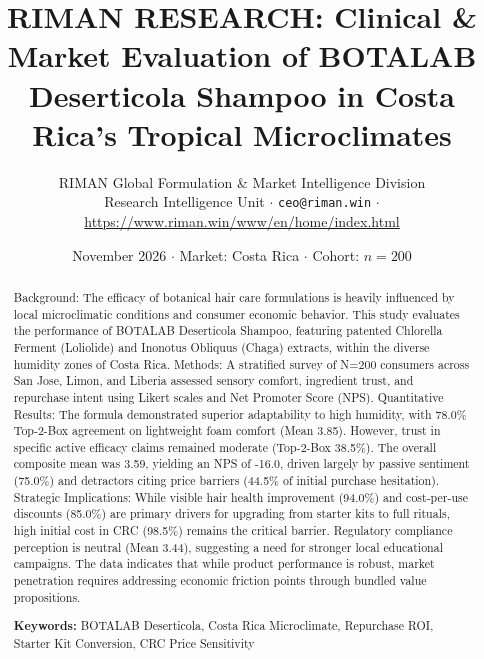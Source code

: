 \documentclass[10pt,twocolumn,a4paper]{article}
\title{\textbf{RIMAN RESEARCH: Clinical \& Market Evaluation of BOTALAB Deserticola Shampoo in Costa Rica's Tropical Microclimates}}
\author{RIMAN Global Formulation \& Market Intelligence Division\\
\small Research Intelligence Unit $\cdot$ \texttt{ceo@riman.win} $\cdot$ \url{https://www.riman.win/www/en/home/index.html}}
\date{November 2026 \quad $\cdot$ \quad Market: Costa Rica \quad $\cdot$ \quad Cohort: $n = 200$}
\begin{document}
\maketitle

\begin{abstract}
Background: The efficacy of botanical hair care formulations is heavily influenced by local microclimatic conditions and consumer economic behavior. This study evaluates the performance of BOTALAB Deserticola Shampoo, featuring patented Chlorella Ferment (Loliolide) and Inonotus Obliquus (Chaga) extracts, within the diverse humidity zones of Costa Rica. Methods: A stratified survey of N=200 consumers across San Jose, Limon, and Liberia assessed sensory comfort, ingredient trust, and repurchase intent using Likert scales and Net Promoter Score (NPS). Quantitative Results: The formula demonstrated superior adaptability to high humidity, with 78.0\% Top-2-Box agreement on lightweight foam comfort (Mean 3.85). However, trust in specific active efficacy claims remained moderate (Top-2-Box 38.5\%). The overall composite mean was 3.59, yielding an NPS of -16.0, driven largely by passive sentiment (75.0\%) and detractors citing price barriers (44.5\% of initial purchase hesitation). Strategic Implications: While visible hair health improvement (94.0\%) and cost-per-use discounts (85.0\%) are primary drivers for upgrading from starter kits to full rituals, high initial cost in CRC (98.5\%) remains the critical barrier. Regulatory compliance perception is neutral (Mean 3.44), suggesting a need for stronger local educational campaigns. The data indicates that while product performance is robust, market penetration requires addressing economic friction points through bundled value propositions.

\vspace{0.4em}
\noindent\textbf{Keywords:} BOTALAB Deserticola, Costa Rica Microclimate, Repurchase ROI, Starter Kit Conversion, CRC Price Sensitivity
\end{abstract}
\end{document}
